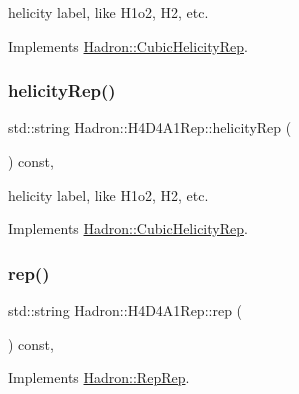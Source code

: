 helicity label, like H1o2, H2, etc. 

Implements \mbox{\hyperlink{structHadron_1_1CubicHelicityRep_af1096946b7470edf0a55451cc662f231}{Hadron\+::\+Cubic\+Helicity\+Rep}}.

\mbox{\label{structHadron_1_1H4D4A1Rep_a8ac76b2d5ec00ea18a04b62a2a5d20bb}} 
\subsubsection{\texorpdfstring{helicityRep()}{helicityRep()}\hspace{0.1cm}{\footnotesize\ttfamily [2/2]}}
{\footnotesize\ttfamily std\+::string Hadron\+::\+H4\+D4\+A1\+Rep\+::helicity\+Rep (\begin{DoxyParamCaption}{ }\end{DoxyParamCaption}) const\hspace{0.3cm}{\ttfamily [inline]}, {\ttfamily [virtual]}}

helicity label, like H1o2, H2, etc. 

Implements \mbox{\hyperlink{structHadron_1_1CubicHelicityRep_af1096946b7470edf0a55451cc662f231}{Hadron\+::\+Cubic\+Helicity\+Rep}}.

\mbox{\label{structHadron_1_1H4D4A1Rep_a5b67fac5b33edc0fa72a93420b2714ca}} 
\subsubsection{\texorpdfstring{rep()}{rep()}\hspace{0.1cm}{\footnotesize\ttfamily [1/3]}}
{\footnotesize\ttfamily std\+::string Hadron\+::\+H4\+D4\+A1\+Rep\+::rep (\begin{DoxyParamCaption}{ }\end{DoxyParamCaption}) const\hspace{0.3cm}{\ttfamily [inline]}, {\ttfamily [virtual]}}



Implements \mbox{\hyperlink{structHadron_1_1RepRep_ab3213025f6de249f7095892109575fde}{Hadron\+::\+Rep\+Rep}}.

\mbox{\label{structHadron_1_1H4D4A1Rep_a5b67fac5b33edc0fa72a93420b2714ca}} 
